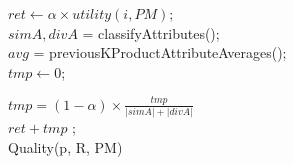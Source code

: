 \begin{algorithm}[ht]
  \DontPrintSemicolon

  $ret \gets \alpha \times utility(i, PM)$; \\
  $simA, divA$ = classifyAttributes(); \\
  $avg$ = previousKProductAttributeAverages(); \\
  $tmp \gets 0$;\\

  $tmp = (1-\alpha) \times \frac{tmp} {\lvert simA\rvert + \lvert divA\rvert}$\\
  \Return $ret + tmp$ ;\\
  \caption{Quality(p, R, PM)}
  \label{algo:quality2}
\end{algorithm}

